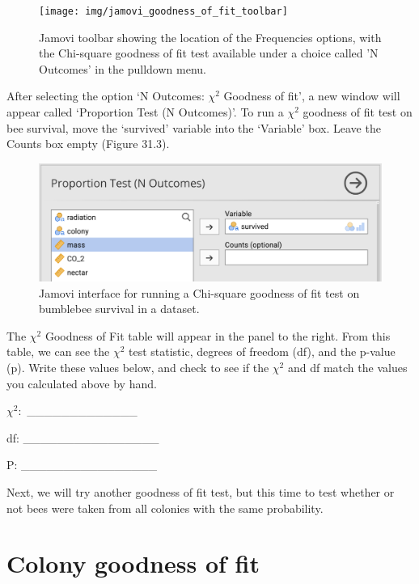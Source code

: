 \documentclass[
]{scrbook}
\begin{document}
\begin{figure}
\texttt{[image: img/jamovi\_goodness\_of\_fit\_toolbar]} \caption{Jamovi toolbar showing the location of the Frequencies options, with the Chi-square goodness of fit test available under a choice called 'N Outcomes' in the pulldown menu.}\label{fig:unnamed-chunk-153}
\end{figure}

After selecting the option `N Outcomes: \(\chi^{2}\) Goodness of fit', a new window will appear called `Proportion Test (N Outcomes)'.
To run a \(\chi^{2}\) goodness of fit test on bee survival, move the `survived' variable into the `Variable' box.
Leave the Counts box empty (Figure 31.3).

\begin{figure}
\includegraphics[width=1\linewidth]{img/jamovi_goodness_of_fit_interface} \caption{Jamovi interface for running a Chi-square goodness of fit test on bumblebee survival in a dataset.}\label{fig:unnamed-chunk-154}
\end{figure}

The \(\chi^{2}\) Goodness of Fit table will appear in the panel to the right.
From this table, we can see the \(\chi^{2}\) test statistic, degrees of freedom (df), and the p-value (p).
Write these values below, and check to see if the \(\chi^{2}\) and df match the values you calculated above by hand.

\(\chi^{2}:\) \_\_\_\_\_\_\_\_\_\_\_\_\_

df: \_\_\_\_\_\_\_\_\_\_\_\_\_\_\_\_

P: \_\_\_\_\_\_\_\_\_\_\_\_\_\_\_\_

Next, we will try another goodness of fit test, but this time to test whether or not bees were taken from all colonies with the same probability.

\hypertarget{colony-goodness-of-fit}{%
\section{Colony goodness of fit}\label{colony-goodness-of-fit}}
\end{document}
